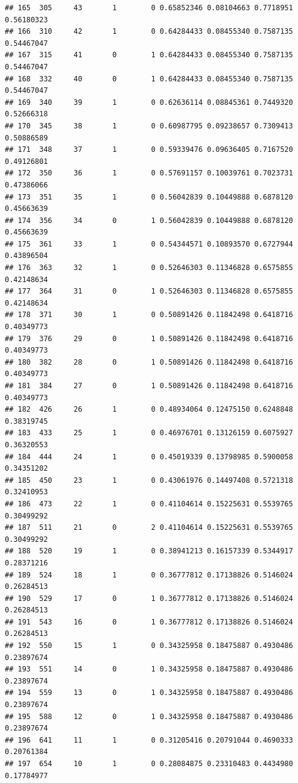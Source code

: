 \documentclass[
]{book}
\begin{document}
\begin{verbatim}
## 165  305     43       1        0 0.65852346 0.08104663 0.7718951 0.56180323
## 166  310     42       1        0 0.64284433 0.08455340 0.7587135 0.54467047
## 167  315     41       0        1 0.64284433 0.08455340 0.7587135 0.54467047
## 168  332     40       0        1 0.64284433 0.08455340 0.7587135 0.54467047
## 169  340     39       1        0 0.62636114 0.08845361 0.7449320 0.52666318
## 170  345     38       1        0 0.60987795 0.09238657 0.7309413 0.50886589
## 171  348     37       1        0 0.59339476 0.09636405 0.7167520 0.49126801
## 172  350     36       1        0 0.57691157 0.10039761 0.7023731 0.47386066
## 173  351     35       1        0 0.56042839 0.10449888 0.6878120 0.45663639
## 174  356     34       0        1 0.56042839 0.10449888 0.6878120 0.45663639
## 175  361     33       1        0 0.54344571 0.10893570 0.6727944 0.43896504
## 176  363     32       1        0 0.52646303 0.11346828 0.6575855 0.42148634
## 177  364     31       0        1 0.52646303 0.11346828 0.6575855 0.42148634
## 178  371     30       1        0 0.50891426 0.11842498 0.6418716 0.40349773
## 179  376     29       0        1 0.50891426 0.11842498 0.6418716 0.40349773
## 180  382     28       0        1 0.50891426 0.11842498 0.6418716 0.40349773
## 181  384     27       0        1 0.50891426 0.11842498 0.6418716 0.40349773
## 182  426     26       1        0 0.48934064 0.12475150 0.6248848 0.38319745
## 183  433     25       1        0 0.46976701 0.13126159 0.6075927 0.36320553
## 184  444     24       1        0 0.45019339 0.13798985 0.5900058 0.34351202
## 185  450     23       1        0 0.43061976 0.14497408 0.5721318 0.32410953
## 186  473     22       1        0 0.41104614 0.15225631 0.5539765 0.30499292
## 187  511     21       0        2 0.41104614 0.15225631 0.5539765 0.30499292
## 188  520     19       1        0 0.38941213 0.16157339 0.5344917 0.28371216
## 189  524     18       1        0 0.36777812 0.17138826 0.5146024 0.26284513
## 190  529     17       0        1 0.36777812 0.17138826 0.5146024 0.26284513
## 191  543     16       0        1 0.36777812 0.17138826 0.5146024 0.26284513
## 192  550     15       1        0 0.34325958 0.18475887 0.4930486 0.23897674
## 193  551     14       0        1 0.34325958 0.18475887 0.4930486 0.23897674
## 194  559     13       0        1 0.34325958 0.18475887 0.4930486 0.23897674
## 195  588     12       0        1 0.34325958 0.18475887 0.4930486 0.23897674
## 196  641     11       1        0 0.31205416 0.20791044 0.4690333 0.20761384
## 197  654     10       1        0 0.28084875 0.23310483 0.4434980 0.17784977

\end{verbatim}
\end{document}
